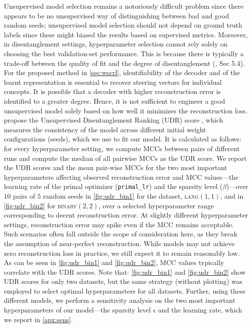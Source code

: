 \documentclass{article}
\begin{document}
Unsupervised model selection remains a notoriously difficult problem since there appears to be no unsupervised way of distinguishing between bad and good random seeds; unsupervised model selection should not depend on ground truth labels since these might biased the results based on supervised metrics. Moreover, in disentanglement settings, hyperparameter selection cannot rely solely on choosing the best validation-set performance. This is because there is typically a trade-off between the quality of fit and the degree of disentanglement (\citep{locatello2019challengingcommonassumptionsunsupervised}, Sec 5.4). For the proposed method in \cref{sec:wscrl}, identifiability of the decoder and of the learnt representation is essential to recover steering vectors for individual concepts. It is possible that a decoder with higher reconstruction error is identified to a greater degree. Hence, it is not sufficient to engineer a good unsupervised model solely based on how well it minimizes the reconstruction loss. \citet{duan2019unsupervised} propose the Unsupervised Disentanglement Ranking (UDR) score \citep{duan2019unsupervised}, which measures the consistency of the model across different initial weight configurations (seeds), which we use to fit our model. It is calculated as follows: for every hyperparameter setting, we compute MCCs between pairs of different runs and compute the median of all pairwise MCCs as the UDR score. We report the UDR scores and the mean pair-wise MCCs for the two most important hyperparameters affecting observed reconstruction error and MCC values---the learning rate of the primal optimizer (\texttt{primal\_lr}) and the sparsity level ($\beta$)---over $10$ pairs of $5$ random seeds in \cref{fig:udr_bin1} for the dataset, \textsc{lang}$(1, 1)$, and in \cref{fig:udr_bin2} for \textsc{binary}$(2, 2)$, over a selected hyperparameter range corresponding to decent reconstruction error. At slightly different hyperparameter settings, reconstruction error may spike even if the MCC remains acceptable. Such scenarios often fall outside the scope of consideration here, as they break the assumption of near-perfect reconstruction. While models may not achieve zero reconstruction loss in practice, we still expect it to remain reasonably low. As can be seen in \cref{fig:udr_bin1} and \cref{fig:udr_bin2}, MCC values typically correlate with the UDR scores.  Note that: \cref{fig:udr_bin1} and \cref{fig:udr_bin2} show UDR scores for only two datasets, but the same strategy (without plotting) was employed to select optimal hyperparameters for all datasets. Further, using these different models, we perform a sensitivity analysis on the two most important hyperparameters of our model---the sparsity level $\epsilon$ and the learning rate, which we report in \cref{apx:sens}.
\end{document}
